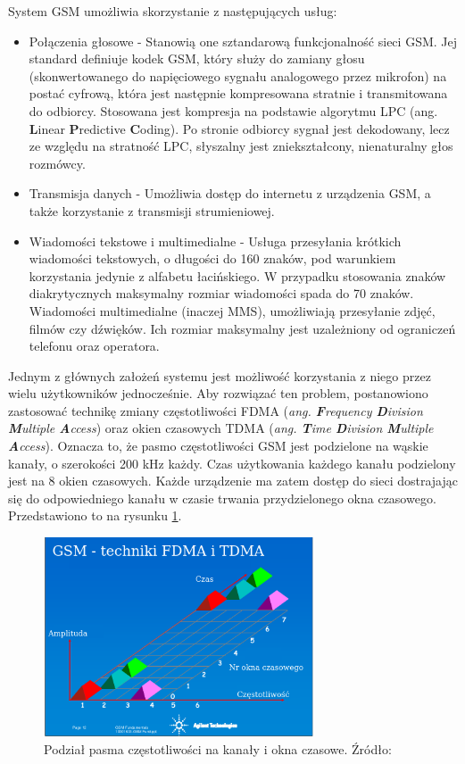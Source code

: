 System GSM umożliwia skorzystanie z następujących usług:
\begin{itemize}
	\item Połączenia głosowe - Stanowią one sztandarową funkcjonalność sieci GSM. Jej standard definiuje kodek GSM, który służy do zamiany głosu (skonwertowanego do napięciowego sygnału analogowego przez mikrofon) na postać cyfrową, która jest następnie kompresowana stratnie i transmitowana do odbiorcy. Stosowana jest kompresja na podstawie algorytmu LPC (ang. \textbf{L}inear \textbf{P}redictive \textbf{C}oding). Po stronie odbiorcy sygnał jest dekodowany, lecz ze względu na stratność LPC, słyszalny jest zniekształcony, nienaturalny głos rozmówcy.
	\item Transmisja danych - Umożliwia dostęp do internetu z urządzenia GSM, a także korzystanie z transmisji strumieniowej.
	\item Wiadomości tekstowe i multimedialne - Usługa przesyłania krótkich wiadomości tekstowych, o długości do 160 znaków, pod warunkiem korzystania jedynie z alfabetu łacińskiego. W przypadku stosowania znaków diakrytycznych maksymalny rozmiar wiadomości spada do 70 znaków. Wiadomości multimedialne (inaczej MMS), umożliwiają przesyłanie zdjęć, filmów czy dźwięków. Ich rozmiar maksymalny jest uzależniony od ograniczeń telefonu oraz operatora.
\end{itemize}

Jednym z głównych założeń systemu jest możliwość korzystania z niego przez wielu użytkowników jednocześnie. Aby rozwiązać ten problem, postanowiono zastosować technikę zmiany częstotliwości FDMA (\textit{ang. \textbf{F}requency \textbf{D}ivision \textbf{M}ultiple \textbf{A}ccess}) oraz okien czasowych TDMA (\textit{ang. \textbf{T}ime \textbf{D}ivision \textbf{M}ultiple \textbf{A}ccess}). Oznacza to, że pasmo częstotliwości GSM jest podzielone na wąskie kanały, o szerokości 200 kHz każdy. Czas użytkowania każdego kanału podzielony jest na 8 okien czasowych. Każde urządzenie ma zatem dostęp do sieci dostrajając się do odpowiedniego kanału w czasie trwania przydzielonego okna czasowego. Przedstawiono to na rysunku \ref{fig:image_gsm_frequencies_timeslots}.

\begin{figure}[H]
	\centering
	\includegraphics[width=8cm]{img/theory/GSM/gsm_timeslots_frequencies.png}
	\caption{Podział pasma częstotliwości na kanały i okna czasowe. Źródło: \cite{GSM}}
	\label{fig:image_gsm_frequencies_timeslots}
\end{figure}


